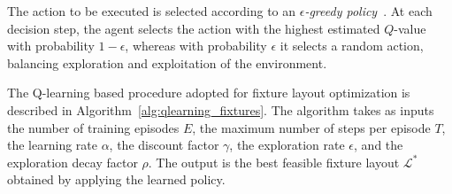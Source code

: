 The action to be executed is selected according to an \textit{\(\epsilon\)-greedy policy}~\cite{sutton1998reinforcement}. At each decision step, the agent selects the action with the highest estimated \(Q\)-value with probability \(1-\epsilon\), whereas with probability \(\epsilon\) it selects a random action, balancing exploration and exploitation of the environment.

The Q-learning based procedure adopted for fixture layout optimization is described in Algorithm~\ref{alg:qlearning_fixtures}. The algorithm takes as inputs the number of training episodes \(E\), the maximum number of steps per episode \(T\), the learning rate \(\alpha\), the discount factor \(\gamma\), the exploration rate \(\epsilon\), and the exploration decay factor \(\rho\). The output is the best feasible fixture layout \(\mathcal{L}^{*}\) obtained by applying the learned policy.

